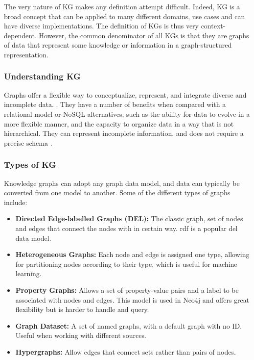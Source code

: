 \documentclass[11pt]{article} %
\begin{document}
The very nature of KG makes any definition attempt difficult. Indeed, KG is a broad concept that can be applied to many different domains, use cases and can have diverse implementations. The definition of KGs is thus very context-dependent. However, the common denominator of all KGs is that they are graphs of data that represent some knowledge or information in a graph-structured representation.

\subsubsection*{Understanding KG}

Graphs offer a flexible way to conceptualize, represent, and integrate diverse and incomplete data.  \cite[p.2]{KG21}. They have a number of benefits when compared with a relational model or NoSQL alternatives, such as the ability for data to evolve in a more flexible manner, and the capacity to organize data in a way that is not hierarchical. They can represent incomplete information, and does not require a precise schema \cite[p.2]{KG21}.

\subsubsection*{Types of KG}
Knowledge graphs can adopt any graph data model, and data can typically be converted from one model to another. Some of the different types of graphs include:

\begin{itemize}
    \item \textbf{Directed Edge-labelled Graphs (DEL):} The classic graph, set of nodes and edges that connect the nodes with in certain way. \acrshort{rdf} is a popular \acrshort{del} data model.
    \item \textbf{Heterogeneous Graphs:} Each node and edge is assigned one type, allowing for partitioning nodes according to their type, which is useful for machine learning.
    \item \textbf{Property Graphs:} Allows a set of property-value pairs and a label to be associated with nodes and edges. This model is used in Neo4j and offers great flexibility but is harder to handle and query.
    \item \textbf{Graph Dataset:} A set of named graphs, with a default graph with no ID. Useful when working with different sources.
    \item \textbf{Hypergraphs:} Allow edges that connect sets rather than pairs of nodes.
\end{itemize}
\end{document}
